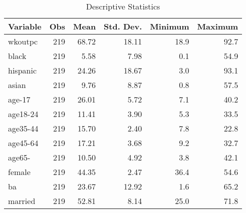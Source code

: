 \documentclass[12pt]{article}%
\begin{document}
\begin{table}[htb] \centering
\label{table1}
   \caption{Descriptive Statistics}
      
\footnotesize %

\begin{tabular}{l|rrrrr} %
\hline %
  Variable &        Obs &       Mean &  Std. Dev. &        Minimum &        Maximum \\
\hline

   wkoutpc &        219 &      68.72 &      18.11 &      18.9 &      92.7 \\

     black &        219 &       5.58 &       7.98 &       0.1 &      54.9 \\

  hispanic &        219 &      24.26 &      18.67 &       3.0 &      93.1 \\

     asian &        219 &       9.76 &       8.87 &       0.8 &      57.5 \\

    age-17 &        219 &      26.01 &       5.72 &       7.1 &      40.2 \\

  age18-24 &        219 &      11.41 &       3.90 &       5.3 &      33.5 \\

  age35-44 &        219 &      15.70 &       2.40 &       7.8 &      22.8 \\

  age45-64 &        219 &      17.21 &       3.68 &       9.2 &      32.7 \\

    age65- &        219 &      10.50 &       4.92 &       3.8 &      42.1 \\

    female &        219 &      44.35 &       2.47 &      36.4 &      54.6 \\

        ba &        219 &      23.67 &      12.92 &       1.6 &      65.2 \\

   married &        219 &      52.81 &       8.14 &      25.0 &      71.8 \\


\end{tabular}
\end{table}
\end{document}
